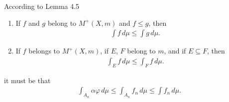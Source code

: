 \documentclass{beamer}
\numberwithin{equation}{section}
\begin{document}
\begin{frame}\frametitle{{\normalsize \secname} \\ {\large \subsecname}}
    According to Lemma 4.5
    \begingroup
    \small
    \begin{lemma}
        \begin{enumerate}
            \item If $f$ and $g$ belong to $M^+(X,m)$ and $f \leq g$, then
            \begin{align}
                \int f \, d\mu \leq \int g \, d\mu.
            \end{align}
            \item If $f$ belongs to $M^+(X,m)$, if $E$, $F$ belong to $m$, and if $E\subseteq F$, then
            \begin{align}
                \int_E f \, d\mu \leq \int_F f \, d\mu.
            \end{align}
        \end{enumerate}
    \end{lemma}
    \endgroup
    it must be that
    \begin{align}\label{eq:bartle_4.7}
        \int_{A_n} \alpha \varphi \, d\mu \leq \int_{A_n} f_n \, d\mu \leq \int f_n \, d\mu.
    \end{align}
\end{frame}
\end{document}
